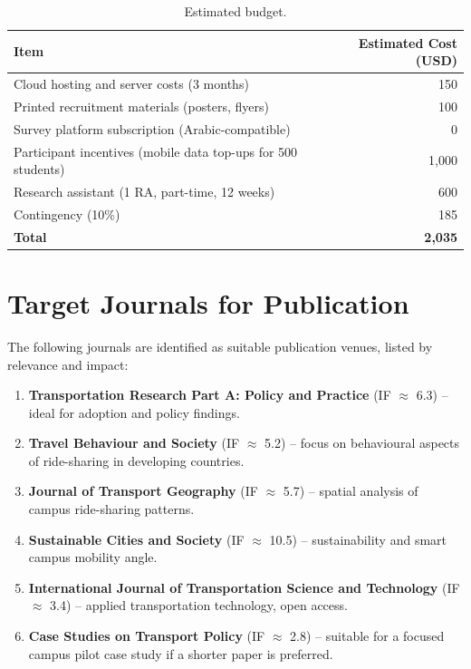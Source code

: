 \documentclass[12pt,a4paper]{article}
\begin{document}
\begin{table}[htbp]
  \centering
  \caption{Estimated budget.}
  \label{tab:budget}
  \begin{tabular}{@{}lr@{}}
    \toprule
    \textbf{Item} & \textbf{Estimated Cost (USD)} \\
    \midrule
    Cloud hosting and server costs (3 months)                    & 150   \\
    Printed recruitment materials (posters, flyers)              & 100   \\
    Survey platform subscription (Arabic-compatible)             & 0     \\
    Participant incentives (mobile data top-ups for 500 students)& 1,000 \\
    Research assistant (1 RA, part-time, 12 weeks)               & 600   \\
    Contingency (10\%)                                           & 185   \\
    \midrule
    \textbf{Total}                                               & \textbf{2,035} \\
    \bottomrule
  \end{tabular}
\end{table}

\section{Target Journals for Publication}
\label{sec:journals}

The following journals are identified as suitable publication venues, listed by relevance and impact:

\begin{enumerate}[nosep]
  \item \textbf{Transportation Research Part A: Policy and Practice} (IF $\approx$ 6.3) -- ideal for adoption and policy findings.
  \item \textbf{Travel Behaviour and Society} (IF $\approx$ 5.2) -- focus on behavioural aspects of ride-sharing in developing countries.
  \item \textbf{Journal of Transport Geography} (IF $\approx$ 5.7) -- spatial analysis of campus ride-sharing patterns.
  \item \textbf{Sustainable Cities and Society} (IF $\approx$ 10.5) -- sustainability and smart campus mobility angle.
  \item \textbf{International Journal of Transportation Science and Technology} (IF $\approx$ 3.4) -- applied transportation technology, open access.
  \item \textbf{Case Studies on Transport Policy} (IF $\approx$ 2.8) -- suitable for a focused campus pilot case study if a shorter paper is preferred.
\end{enumerate}
\end{document}
